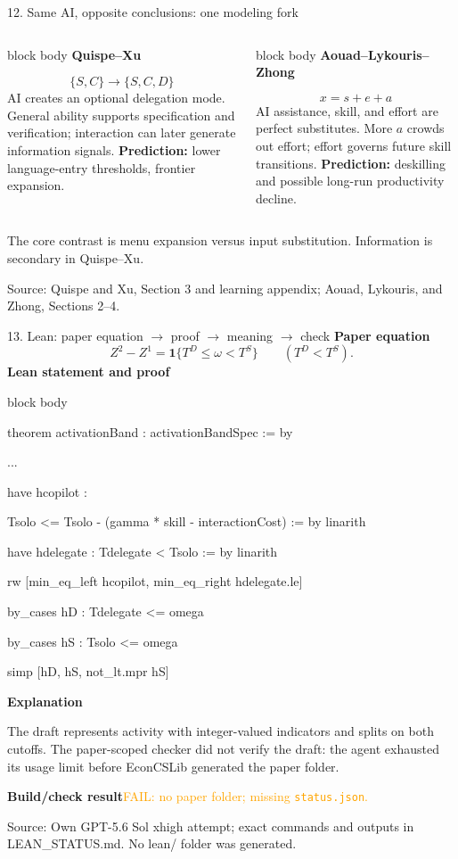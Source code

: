 \documentclass[aspectratio=169,10pt]{beamer}
\newcommand{\source}[1]{\vfill{\color{muted}\tiny Source: #1\par}}
\newcommand{\LeanBuildResult}{\textcolor{orange}{FAIL: no paper folder; missing \texttt{status.json}.}}
\newcommand{\LeanSnippet}{%
\begin{beamercolorbox}[rounded=true,sep=0.45em,wd=\linewidth]{block body}
{\ttfamily\scriptsize
theorem activationBand : activationBandSpec := by\par
\textcolor{muted}{\quad ...}\par
\quad have hcopilot :\par
\qquad Tsolo <= Tsolo - (gamma * skill - interactionCost) := by linarith\par
\quad have hdelegate : Tdelegate < Tsolo := by linarith\par
\quad rw [min\_eq\_left hcopilot, min\_eq\_right hdelegate.le]\par
\quad by\_cases hD : Tdelegate <= omega\par
\quad by\_cases hS : Tsolo <= omega\par
\quad simp [hD, hS, not\_lt.mpr hS]\par}
\end{beamercolorbox}\par\vspace{0.18cm}}
\begin{document}
\begin{frame}{12. Same AI, opposite conclusions: one modeling fork}
  \small
  \begin{columns}[T,onlytextwidth]
      \begin{beamercolorbox}[rounded=true,sep=0.8em]{block body}
        \textbf{Quispe--Xu}\par\vspace{0.3cm}
        \[\{S,C\}\longrightarrow\{S,C,D\}\]
        AI creates an optional delegation mode. General ability supports specification and verification; interaction can later generate information signals.
        \vspace{0.3cm}
        \textbf{Prediction:} lower language-entry thresholds, frontier expansion.
      \end{beamercolorbox}
      \begin{beamercolorbox}[rounded=true,sep=0.8em]{block body}
        \textbf{Aouad--Lykouris--Zhong}\par\vspace{0.3cm}
        \[x=s+e+a\]
        AI assistance, skill, and effort are perfect substitutes. More $a$ crowds out effort; effort governs future skill transitions.
        \vspace{0.3cm}
        \textbf{Prediction:} deskilling and possible long-run productivity decline.
      \end{beamercolorbox}
  \end{columns}
  \vspace{0.35cm}
  \centering\alert{The core contrast is menu expansion versus input substitution. Information is secondary in Quispe--Xu.}
  \source{Quispe and Xu, Section 3 and learning appendix; Aouad, Lykouris, and Zhong, Sections 2--4.}
\end{frame}

\begin{frame}{13. Lean: paper equation $\rightarrow$ proof $\rightarrow$ meaning $\rightarrow$ check}
  \small
  \textbf{Paper equation}
  \[
    Z^2-Z^1=\mathbf 1\{T^D\le\omega<T^S\}\qquad(T^D<T^S).
  \]
  \textbf{Lean statement and proof}
  \LeanSnippet
  \textbf{Explanation}

  The draft represents activity with integer-valued indicators and splits on both cutoffs. The paper-scoped checker did not verify the draft: the agent exhausted its usage limit before EconCSLib generated the paper folder.

  \textbf{Build/check result}\quad \LeanBuildResult
  \source{Own GPT-5.6 Sol xhigh attempt; exact commands and outputs in LEAN\_STATUS.md. No lean/ folder was generated.}
\end{frame}
\end{document}
